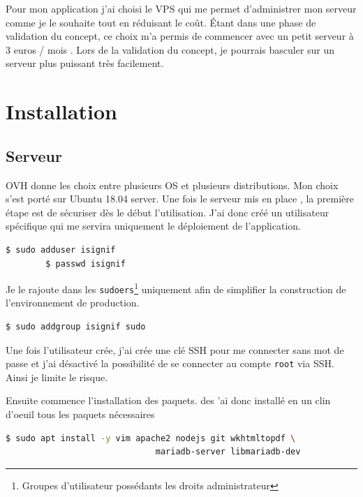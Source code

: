 \documentclass[]{report}
\begin{document}
      Pour mon application j’ai choisi le VPS qui me permet d’administrer mon serveur comme je le souhaite tout en réduisant le coût. Étant dans une phase de validation du concept, ce choix m’a permis de commencer avec un petit serveur à 3 euros / mois . Lors de la validation du concept, je pourrais basculer sur un serveur plus puissant très facilement.

  \section{Installation}

    \subsection{Serveur}

      OVH donne les choix entre plusieurs OS et plusieurs distributions. Mon choix s’est porté sur Ubuntu 18.04 server. Une fois le serveur mis en place , la première étape est de sécuriser dès le début l’utilisation. J’ai donc créé un utilisateur spécifique qui me servira uniquement le déploiement de l’application.

      \begin{scriptsize}
        \begin{lstlisting}[language=bash]
        $ sudo adduser isignif
        $ passwd isignif
        \end{lstlisting}
      \end{scriptsize}

      Je le rajoute dans les \verb|sudoers|\footnote{Groupes d’utilisateur possédants les droits administrateur} uniquement afin de simplifier la construction de l’environnement de production.

      \begin{scriptsize}
        \begin{lstlisting}[language=bash]
        $ sudo addgroup isignif sudo
        \end{lstlisting}
      \end{scriptsize}

      Une fois l’utilisateur crée, j’ai crée une clé SSH pour me connecter sans mot de passe et j’ai désactivé la possibilité de se connecter au compte \verb|root| via SSH. Ainsi je limite le risque.

      Ensuite commence l’installation des paquets. des ’ai donc installé en un clin d’oeuil tous les paquets nécessaires

      \begin{scriptsize}
        \begin{lstlisting}[language=bash]
        $ sudo apt install -y vim apache2 nodejs git wkhtmltopdf \
                              mariadb-server libmariadb-dev
        \end{lstlisting}
      \end{scriptsize}
\end{document}

